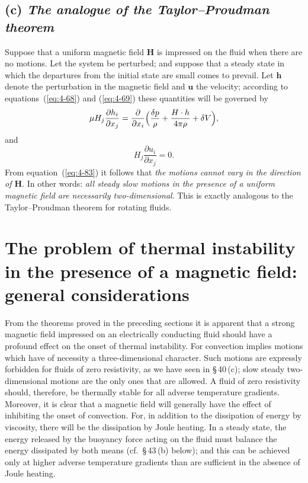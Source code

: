 \subsection*{(c) \emph{The analogue of the Taylor--Proudman theorem}}

Suppose that a uniform magnetic field $\mathbf{H}$ is impressed on the fluid when there are no motions. Let the system be perturbed; and suppose that a steady state in which the departures from the initial state are small comes to prevail. Let $\mathbf{h}$ denote the perturbation in the magnetic field and $\mathbf{u}$ the velocity; according to equations~(\ref{eq:4-68}) and (\ref{eq:4-69}) these quantities will be governed by
\begin{equation}
\label{eq:4-82}
\mu H_j\frac{\partial h_i}{\partial x_j} = \frac{\partial}{\partial x_i}\Bigl(\frac{\delta p}{\rho}+\frac{\mathbf{H}\cdot\mathbf{h}}{4\pi\rho}+\delta V\Bigr),
\end{equation}
and
\begin{equation}
\label{eq:4-83}
H_j\frac{\partial u_i}{\partial x_j} = 0.
\end{equation}
From equation~(\ref{eq:4-83}) it follows that \emph{the motions cannot vary in the direction of $\mathbf{H}$}. In other words: \emph{all steady slow motions in the presence of a uniform magnetic field are necessarily two-dimensional}. This is exactly analogous to the Taylor--Proudman theorem for rotating fluids.

\section{The problem of thermal instability in the presence of a magnetic field: general considerations}\label{sec:41}

From the theorems proved in the preceding sections it is apparent that a strong magnetic field impressed on an electrically conducting fluid should have a profound effect on the onset of thermal instability. For convection implies motions which have of necessity a three-dimensional character. Such motions are expressly forbidden for fluids of zero resistivity, as we have seen in \S\,40\,(c); slow steady two-dimensional motions are the only ones that are allowed. A fluid of zero resistivity should, therefore, be thermally stable for all adverse temperature gradients. Moreover, it is clear that a magnetic field will generally have the effect of inhibiting the onset of convection. For, in addition to the dissipation of energy by viscosity, there will be the dissipation by Joule heating. In a steady state, the energy released by the buoyancy force acting on the fluid must balance the energy dissipated by both means (cf.\ \S\,43\,(b) below); and this can be achieved only at higher adverse temperature gradients than are sufficient in the absence of Joule heating.

